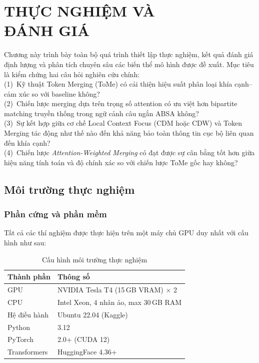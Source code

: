 \providecommand{\cmark}{\ensuremath{\checkmark}}
\providecommand{\xmark}{\ensuremath{\times}}

\chapter{THỰC NGHIỆM VÀ \\ĐÁNH GIÁ}
\label{chap:experiments}

Chương này trình bày toàn bộ quá trình thiết lập thực nghiệm, kết quả
đánh giá định lượng và phân tích chuyên sâu các biến thể mô hình được
đề xuất. Mục tiêu là kiểm chứng hai câu hỏi nghiên cứu chính:
\\(1)~Kỹ thuật Token Merging (ToMe) có cải thiện hiệu suất phân loại
khía cạnh–cảm xúc so với baseline không?
\\(2)~Chiến lược merging dựa trên trọng số attention có ưu việt hơn
bipartite matching truyền thống trong ngữ cảnh câu ngắn ABSA không?
\\(3)~Sự kết hợp giữa cơ chế Local Context Focus (CDM
hoặc CDW) và Token Merging tác động như thế nào đến khả năng bảo
toàn thông tin cục bộ liên quan đến khía cạnh?
\\(4)~Chiến lược \textit{Attention-Weighted Merging}
có đạt được sự cân bằng tốt hơn giữa hiệu năng tính toán và độ
chính xác so với chiến lược ToMe gốc hay không?

\section{Môi trường thực nghiệm}
\label{sec:exp_setup}

\subsection{Phần cứng và phần mềm}

Tất cả các thí nghiệm được thực hiện trên một máy chủ GPU duy nhất
với cấu hình như sau:

\begin{table}[H]
\centering
\caption{Cấu hình môi trường thực nghiệm}
\label{tab:env}
\begin{tabular}{ll}
\toprule
\textbf{Thành phần} & \textbf{Thông số} \\
\midrule
GPU  & NVIDIA Tesla T4 (15\,GB VRAM) $\times$ 2 \\
CPU  & Intel Xeon, 4 nhân ảo, max 30\,GB RAM \\
Hệ điều hành & Ubuntu 22.04 (Kaggle) \\
Python & 3.12 \\
PyTorch & 2.0+ (CUDA 12) \\
Transformers & HuggingFace 4.36+ \\
\bottomrule
\end{tabular}
\end{table}

